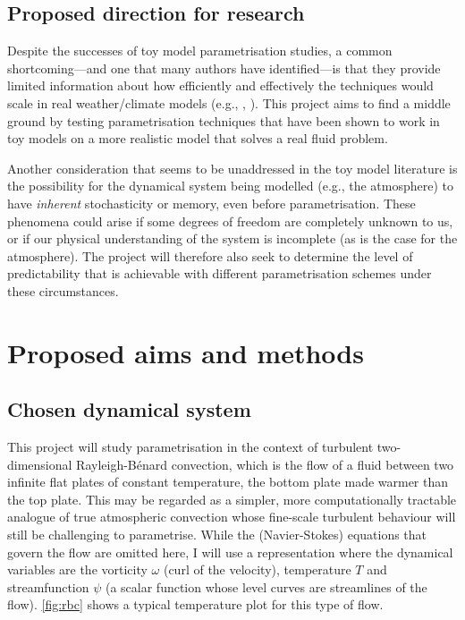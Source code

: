 \documentclass[titlepage]{article}
\newcommand{\rb}{Rayleigh-B\'{e}nard}
\begin{document}
\subsection{Proposed direction for research}
Despite the successes of toy model parametrisation studies, a common
shortcoming---and one that many authors have identified---is that they provide
limited information about how efficiently and effectively the techniques would
scale in real weather/climate models (e.g., \cite{wilks2005},
\cite{crommelin2008}).
This project aims to find a middle ground by testing parametrisation techniques
that have been shown to work in toy models on a more realistic model that
solves a real fluid problem.

Another consideration that seems to be unaddressed in the toy model literature
is the possibility for the dynamical system being modelled (e.g., the
atmosphere) to have \emph{inherent} stochasticity or memory, even before
parametrisation. These phenomena could arise if some degrees of freedom are
completely unknown to us, or if our physical understanding of the system is
incomplete (as is the case for the atmosphere). The project will therefore
also seek to determine the level of predictability that is achievable with
different parametrisation schemes under these circumstances.

\section{Proposed aims and methods}
\subsection{Chosen dynamical system}
This project will study parametrisation in the context of turbulent
two-dimensional \rb{} convection, which is the flow of a fluid between two
infinite flat plates of constant temperature, the bottom plate made warmer than
the top plate. This may be regarded as a simpler, more computationally
tractable analogue of true atmospheric convection whose fine-scale turbulent
behaviour will still be challenging to parametrise. While the (Navier-Stokes)
equations that govern the flow are omitted here, I will use a representation
where the dynamical variables are the vorticity $\omega$ (curl of the
velocity), temperature $T$ and streamfunction $\psi$ (a scalar function whose
level curves are streamlines of the flow). \autoref{fig:rbc} shows a typical
temperature plot for this type of flow.
\end{document}
